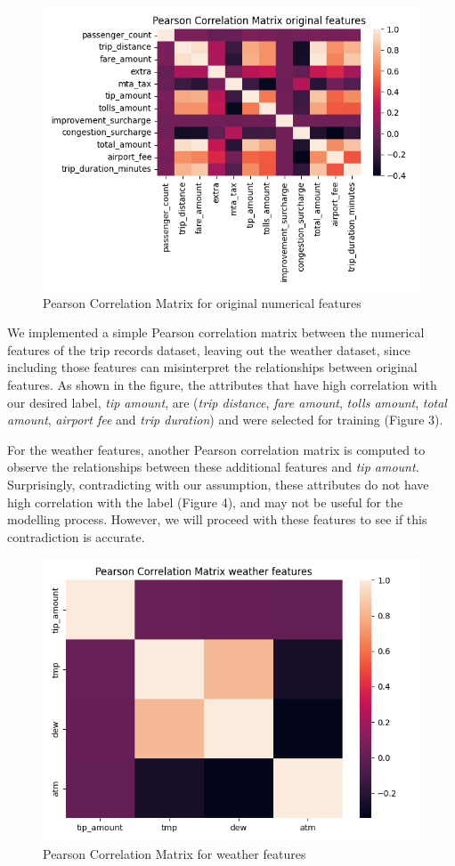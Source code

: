 \documentclass[11pt]{article}
\begin{document}
\begin{figure}[h]
    \centering
    \includegraphics[width=0.65\linewidth]{plots/pearson_correlation_matrix.png}
    \caption{Pearson Correlation Matrix for original numerical features}
\end{figure}

We implemented a simple Pearson correlation matrix between the numerical features of the trip records dataset, leaving out the weather dataset, since including those features can misinterpret the relationships between original features. As shown in the figure, the attributes that have high correlation with our desired label, \textit{tip amount}, are (\textit{trip distance}, \textit{fare amount}, \textit{tolls amount}, \textit{total amount}, \textit{airport fee} and \textit{trip duration}) and were selected for training (Figure 3).

For the weather features, another Pearson correlation matrix is computed to observe the relationships between these additional features and \textit{tip amount}. Surprisingly, contradicting with our assumption, these attributes do not have high correlation with the label (Figure 4), and may not be useful for the modelling process. However, we will proceed with these features to see if this contradiction is accurate.

\begin{figure}[h]
    \centering
    \includegraphics[width=0.5\linewidth]{plots/pearson_correlation_weather_matrix.png}
    \caption{Pearson Correlation Matrix for weather features}
\end{figure}
\end{document}
